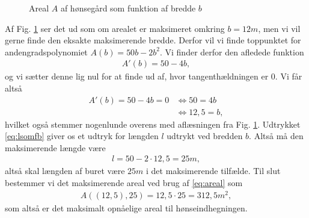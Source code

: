 \begin{exa}
\begin{figure}[H]
\caption{Areal $A$ af hønsegård som funktion af bredde $b$}
\label{fig:honsegraf}
\end{figure}
Af Fig. \ref{fig:honsegraf} ser det ud som om arealet er maksimeret omkring $b=12m$, men vi vil gerne finde den eksakte maksimerende bredde. Derfor vil vi finde toppunktet for andengradspolynomiet $A(b) = 50b-2b^2$. Vi finder derfor den afledede funktion
\begin{align*}
A'(b) = 50-4b,
\end{align*}
og vi sætter denne lig nul for at finde ud af, hvor tangenthældningen er $0$. Vi får altså
\begin{align*}
A'(b) = 50-4b = 0 &\Leftrightarrow 50=4b\\
&\Leftrightarrow 12,5=b,
\end{align*}
hvilket også stemmer nogenlunde overens med aflæsningen fra Fig. \ref{fig:honsegraf}. Udtrykket \eqref{eq:lsomfb} giver os et udtryk for længden $l$ udtrykt ved bredden $b$. Altså må den maksimerende længde være 
\begin{align*}
l = 50-2\cdot 12,5 = 25m,
\end{align*}
altså skal længden af buret være $25m$ i det maksimerende tilfælde. Til slut bestemmer vi det maksimerende areal ved brug af \eqref{eq:areal} som
\begin{align*}
A((12,5),25) = 12,5\cdot25 = 312,5m^2,
\end{align*}
som altså er det maksimalt opnåelige areal til hønseindhegningen. 
\end{exa}
